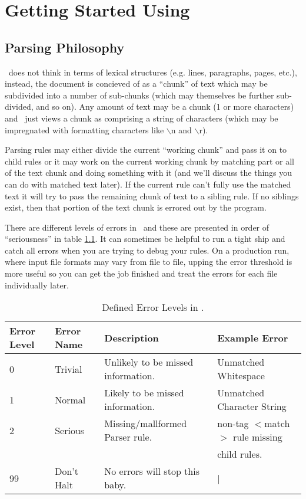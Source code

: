 
\chapter{Getting Started Using \program}

\section{Parsing Philosophy}
\label{sec:philosophy}

\program\ does not think in terms of lexical structures (e.g. lines, 
paragraphs, pages, etc.), instead, the document is concieved of
as a ``chunk'' of text which may be subdivided into a number of
sub-chunks (which may themselves be further sub-divided, and so on). 
Any amount of text may be a chunk (1 or more characters) and
\program\ just views a chunk as comprising a string of characters (which
may be impregnated with formatting characters like $\backslash$n 
and $\backslash$r).

Parsing rules may either divide the current ``working chunk'' 
and pass it on to child rules or 
it may work on the current working chunk by 
matching part or all of the text chunk and doing something with
it (and we'll discuss the things you can do with matched text later). 
If the current rule can't fully use the matched text it will try
to pass the remaining chunk of text to a sibling rule.
If no siblings exist, then that portion of the text chunk is 
errored out by the program.

There are different levels of errors
in \program\ and these are presented in order of ``seriousness'' in 
table \ref{tab:errors}. It can sometimes be helpful to run a tight ship
and catch all errors when you are trying to debug your rules. On a
production run, where input file formats may vary from file to file, 
upping the error threshold is more useful so you can get the job finished
and treat the errors for each file individually later. 

{\footnotesize
\begin{table}
 \begin{center}
 \caption{Defined Error Levels in \program .}
 \label{tab:errors}
  \vskip 12pt
  \begin{tabular}{|llll|} \hline
Error Level & Error Name & Description & Example Error \\ \hline\hline
 0 & Trivial & Unlikely to be missed information. & Unmatched Whitespace  \\
 1 & Normal  & Likely to be missed information. & Unmatched Character String \\
 2 & Serious & Missing/mallformed Parser rule. & non-tag $<$match$>$ rule missing \\
   & & & child rules. \\
 99 & Don't Halt & No errors will stop this baby. & | \\ \hline 
   \end{tabular}
  \end{center}
\end{table}
}

